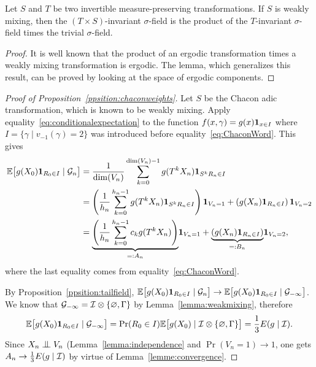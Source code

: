 \documentclass[12pt,a4paper]{article}
\begin{document}
\begin{lemma}\label{lemma:weakmixing}
Let $S$ and $T$ be two invertible measure-preserving transformations. 
If $S$ is weakly mixing, then the $(T\times S)$-invariant $\sigma$-field is 
the product of the $T$-invariant $\sigma$-field times the trivial $\sigma$-field.
\end{lemma}

\begin{proof}
It is well known that the product of an ergodic transformation times a weakly mixing 
transformation is ergodic. 
The lemma, which generalizes this result,  can be proved by 
looking at the space of ergodic components. 
\end{proof}

\begin{proof}[Proof of Proposition~\ref{ppsition:chaconweights}]
Let $S$ be the Chacon adic transformation, which is known to be weakly mixing. 
Apply equality~\eqref{eq:conditionalexpectation} to the function
$f(x,\gamma) = g(x)\boldsymbol 1_{x \in I}$ where $I = \{\gamma \mid v_{-1}(\gamma)=2\}$ 
was introduced before equality~\eqref{eq:ChaconWord}. 
This gives
\begin{align*}
\mathbb{E}\bigl[g(X_0) \boldsymbol 1_{R_0 \in I} \mid \mathcal{G}_n\bigr]
&  = \frac{1}{\dim(V_n)}\sum_{k=0}^{\dim(V_n)-1} g(T^kX_n) \boldsymbol 1_{S^k R_n \in I} \\
& = \left(\frac{1}{h_n}\sum_{k=0}^{h_n-1} g(T^kX_n) \boldsymbol 1_{S^k R_n \in I}\right)\boldsymbol 1_{V_n=1} 
+ \left(g(X_n) \boldsymbol 1_{R_n \in I}\right)\boldsymbol 1_{V_n=2} \\
& = \underset{=:A_n}{\underbrace{\left(\frac{1}{h_n}\sum_{k=0}^{h_n-1} c_k g(T^kX_n) \right)}}\boldsymbol 1_{V_n=1} 
+ \underset{=:B_n}{\underbrace{\left(g(X_n) \boldsymbol 1_{R_n \in I}\right)}}\boldsymbol 1_{V_n=2},
\end{align*}
where the last equality comes from equality~\eqref{eq:ChaconWord}. 

By Proposition~\ref{ppsition:tailfield}, 
$\mathbb{E}\bigl[g(X_0) \boldsymbol 1_{R_0 \in I} \mid \mathcal{G}_n\bigr] 
\to \mathbb{E}\bigl[g(X_0) \boldsymbol 1_{R_0 \in I} \mid \mathcal{G}_{-\infty}\bigr]$. 
We know that $\mathcal{G}_{-\infty} = {\cal I} \otimes \{\varnothing, \Gamma\}$ 
by Lemma~\ref{lemma:weakmixing}, therefore 
$$
\mathbb{E}\bigl[g(X_0) \boldsymbol 1_{R_0 \in I} \mid \mathcal{G}_{-\infty}\bigr] = 
\Pr(R_0 \in I) \mathbb{E}\bigl[g(X_0) \mid {\cal I} \otimes \{\varnothing, \Gamma\}\bigr] =
\frac{1}{3} E(g \mid {\cal I}). 
$$
Since $X_n \indep V_n$ (Lemma~\ref{lemma:independence}  and $\Pr(V_n=1) \to 1$, 
one gets $A_n \to \frac{1}{3} E(g \mid {\cal I})$ by virtue of 
Lemma~\ref{lemme:convergence}. 
\end{proof}
\end{document}
